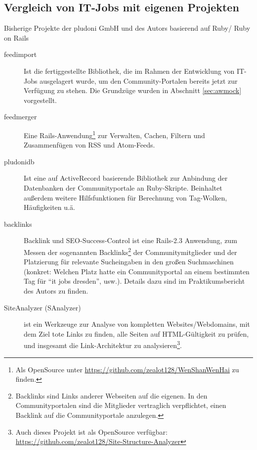 \subsection{Vergleich von IT-Jobs mit eigenen Projekten}

Bisherige Projekte der pludoni GmbH und des Autors basierend auf Ruby/ Ruby on Rails
\begin{description}
 \item[feedimport] Ist die fertiggestellte Bibliothek, die im Rahmen der Entwicklung von IT-Jobs ausgelagert wurde, um den Community-Portalen bereits jetzt zur Verfügung zu stehen. Die Grundzüge wurden in Abschnitt \ref{sec:awmock} vorgestellt.
 \item[feedmerger] Eine Rails-Anwendung\footnote{ Als OpenSource unter \url{https://github.com/zealot128/WenShanWenHai} zu finden.} zur Verwalten, Cachen, Filtern und Zusammenfügen von RSS und Atom-Feeds.
 \item[pludonidb] Ist eine auf ActiveRecord basierende Bibliothek zur Anbindung der Datenbanken der Communityportale an Ruby-Skripte. Beinhaltet außerdem weitere Hilfsfunktionen für Berechnung von Tag-Wolken, Häufigkeiten u.ä.
 \item[backlinks] Backlink und SEO-Success-Control ist eine Rails-2.3 Anwendung, zum Messen der sogenannten Backlinks\footnote{Backlinks sind Links anderer Webseiten auf die eigenen. In den Communityportalen sind die Mitglieder vertraglich verpflichtet, einen Backlink auf die Communityportale anzulegen.} der Communitymitglieder und der Platzierung für relevante Sucheingaben in den großen Suchmaschinen (konkret: Welchen Platz hatte ein Communityportal an einem bestimmten Tag für "`it jobs dresden"', usw.). Details dazu sind im Praktikumsbericht des Autors zu finden. %
 
 \item[SiteAnalyzer (SAnalyzer)] ist ein Werkzeuge zur Analyse von kompletten Websites/Webdomains, mit dem Ziel tote Links zu finden, alle Seiten auf HTML-Gültigkeit zu prüfen, und insgesamt die Link-Architektur zu analysieren\footnote{Auch dieses Projekt ist als OpenSource verfügbar: \url{https://github.com/zealot128/Site-Structure-Analyzer}}. 
\end{description}


